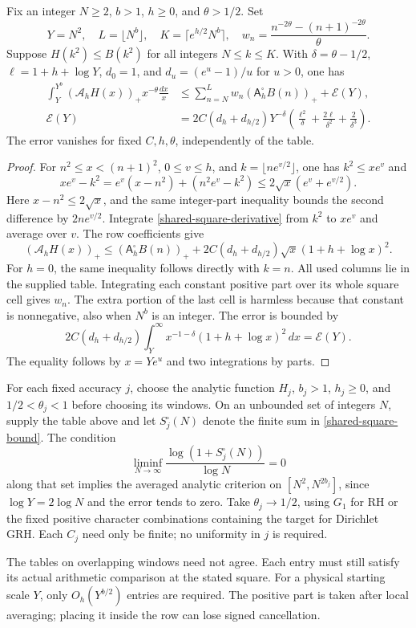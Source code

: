 \begin{theorem}\label{shared-square-table}
Fix an integer \(N\ge2\), \(b>1\), \(h\ge0\), and \(\theta>1/2\).
Set
\[
 Y=N^2,\quad L=\lfloor N^b\rfloor,\quad
 K=\lceil e^{h/2}N^b\rceil,\quad
 w_n=\frac{n^{-2\theta}-(n+1)^{-2\theta}}{\theta}.
\]
Suppose \(H(k^2)\le B(k^2)\) for all integers \(N\le k\le K\).
With \(\delta=\theta-1/2\), \(\ell=1+h+\log Y\),
\(d_0=1\), and \(d_u=(e^u-1)/u\) for \(u>0\), one has
\begin{equation}\label{shared-square-bound}
\begin{split}
 \int_Y^{Y^b}(\mathcal A_hH(x))_+x^{-\theta}\frac{dx}{x}
 &\le \sum_{n=N}^{L}w_n(\mathsf A^\square_hB(n))_+
       +\mathcal E(Y),\\
 \mathcal E(Y)
 &=2C(d_h+d_{h/2})Y^{-\delta}
       \left(\frac{\ell^2}{\delta}
              +\frac{2\ell}{\delta^2}+\frac2{\delta^3}\right).
\end{split}
\end{equation}
The error vanishes for fixed \(C,h,\theta\), independently of the table.
\end{theorem}
\begin{proof}
For \(n^2\le x<(n+1)^2\), \(0\le v\le h\), and
\(k=\lfloor ne^{v/2}\rfloor\), one has \(k^2\le xe^v\) and
\[
 xe^v-k^2=e^v(x-n^2)+(n^2e^v-k^2)
           \le2\sqrt x(e^v+e^{v/2}).
\]
Here \(x-n^2\le2\sqrt x\), and the same integer-part inequality
bounds the second difference by \(2ne^{v/2}\).
Integrate \eqref{shared-square-derivative} from \(k^2\) to \(xe^v\)
and average over \(v\). The row coefficients give
\[
 (\mathcal A_hH(x))_+
 \le(\mathsf A^\square_hB(n))_+
       +2C(d_h+d_{h/2})\sqrt x(1+h+\log x)^2 .
\]
For \(h=0\), the same inequality follows directly with \(k=n\).
All used columns lie in the supplied table. Integrating each constant
positive part over its whole square cell gives \(w_n\).
The extra portion of the last cell is harmless because that constant
is nonnegative, also when \(N^b\) is an integer.
The error is bounded by
\[
 2C(d_h+d_{h/2})
       \int_Y^\infty x^{-1-\delta}(1+h+\log x)^2\,dx
       =\mathcal E(Y).
\]
The equality follows by \(x=Ye^u\) and two integrations by parts.
\end{proof}

For each fixed accuracy \(j\), choose the analytic function \(H_j\),
\(b_j>1\), \(h_j\ge0\), and \(1/2<\theta_j<1\) before choosing its
windows. On an unbounded set of integers \(N\), supply the table above
and let \(S^\square_j(N)\) denote the finite sum in
\eqref{shared-square-bound}. The condition
\[
 \liminf_{N\to\infty}
       \frac{\log(1+S^\square_j(N))}{\log N}=0
\]
along that set implies the averaged analytic criterion on
\([N^2,N^{2b_j}]\), since \(\log Y=2\log N\) and the error tends to zero.
Take \(\theta_j\to1/2\), using \(G_1\) for RH or the fixed positive
character combinations containing the target for Dirichlet GRH.
Each \(C_j\) need only be finite; no uniformity in \(j\) is required.

The tables on overlapping windows need not agree. Each entry must
still satisfy its actual arithmetic comparison at the stated square.
For a physical starting scale \(Y\), only \(O_h(Y^{b/2})\) entries
are required. The positive part is taken after local averaging;
placing it inside the row can lose signed cancellation.
